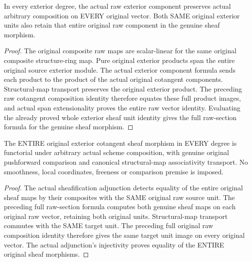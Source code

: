\begin{lemma}\label{sc0-cotangent-functoriality:exterior-raw}
\leanok
{}
In every exterior degree, the actual raw exterior component preserves actual arbitrary composition on EVERY original vector. Both SAME original exterior units also retain that entire original raw component in the genuine sheaf morphism.
\end{lemma}
\begin{proof}
The original composite raw maps are scalar-linear for the same original composite structure-ring map. Pure original exterior products span the entire original source exterior module. The actual exterior component formula sends each product to the product of the actual original cotangent components. Structural-map transport preserves the original exterior product. The preceding raw cotangent composition identity therefore equates these full product images, and actual span extensionality proves the entire raw vector identity. Evaluating the already proved whole exterior sheaf unit identity gives the full raw-section formula for the genuine sheaf morphism.
\end{proof}

\begin{theorem}\label{sc0-cotangent-functoriality:exterior-sheaf}
\leanok
{}
The ENTIRE original exterior cotangent sheaf morphism in EVERY degree is functorial under arbitrary actual scheme composition, with genuine original pushforward comparison and canonical structural-map associativity transport. No smoothness, local coordinates, freeness or comparison premise is imposed.
\end{theorem}
\begin{proof}
The actual sheafification adjunction detects equality of the entire original sheaf maps by their composites with the SAME original raw source unit. The preceding full raw-section formula computes both genuine sheaf maps on each original raw vector, retaining both original units. Structural-map transport commutes with the SAME target unit. The preceding full original raw composition identity therefore gives the same target unit image on every original vector. The actual adjunction's injectivity proves equality of the ENTIRE original sheaf morphisms.
\end{proof}

